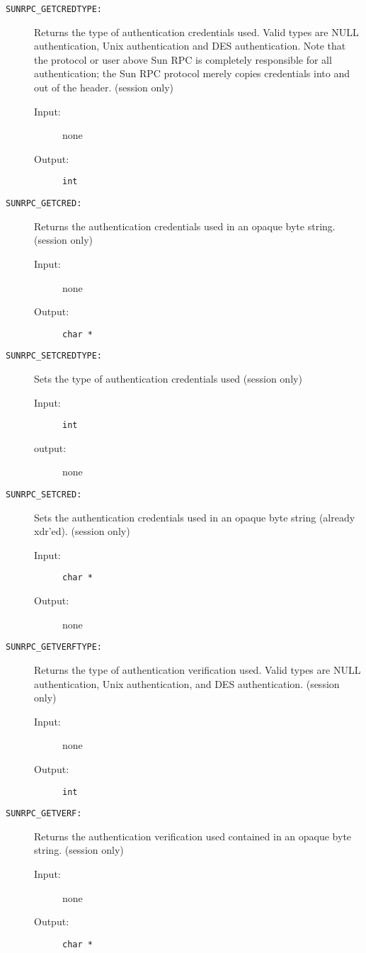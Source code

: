 \begin{description}
\item[{\tt SUNRPC\_GETCREDTYPE:}]
Returns the type of authentication credentials used.
Valid types are NULL authentication, Unix authentication and DES
authentication.  Note that the protocol or user above Sun RPC is 
completely responsible for all authentication; the Sun RPC 
protocol merely copies credentials into and out of the header.
(session only)
\begin{description}
\item[{\rm Input:}] none
\item[{\rm Output:}] {\tt int  }
\end{description}

\item[{\tt SUNRPC\_GETCRED:}]
Returns the authentication credentials used in an 
opaque byte string.  (session only)
\begin{description}
\item[{\rm Input:}] none
\item[{\rm Output:}] {\tt char *   }
\end{description}

\item[{\tt SUNRPC\_SETCREDTYPE:}]
Sets the type of authentication credentials used (session only) 
\begin{description}
\item[{\rm Input:}] {\tt int  }
\item[{\rm output:}] none
\end{description}

\item[{\tt SUNRPC\_SETCRED:}]
Sets the authentication credentials used in an 
opaque byte string (already xdr'ed).  (session only) 
\begin{description}
\item[{\rm Input:}] {\tt char * }
\item[{\rm Output:}] none
\end{description}

\item[{\tt SUNRPC\_GETVERFTYPE:}]
Returns the type of authentication verification used.
Valid types are NULL authentication, Unix authentication, and DES
authentication.  (session only) 
\begin{description}
\item[{\rm Input:}] none
\item[{\rm Output:}] {\tt int  }
\end{description}

\item[{\tt SUNRPC\_GETVERF:}]
Returns the authentication verification used contained in an 
opaque byte string.  (session only) 
\begin{description}
\item[{\rm Input:}] none
\item[{\rm Output:}] {\tt char *   }
\end{description}


\end{description}
